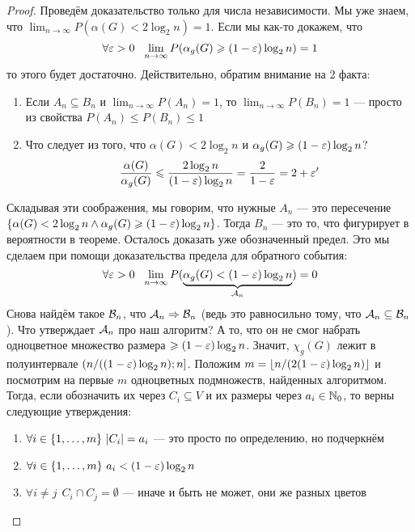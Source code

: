 \begin{proof}
	Проведём доказательство только для числа независимости. Мы уже знаем, что $\lim_{n \to \infty} P(\alpha(G) < 2\log_2 n) = 1$. Если мы как-то докажем, что
	\[
		\forall \varepsilon > 0\ \ \lim_{n \to \infty} P(\alpha_g(G) \geqslant (1 - \varepsilon)\log_2 n) = 1
	\]
	то этого будет достаточно. Действительно, обратим внимание на 2 факта:
	\begin{enumerate}
		\item Если $A_n \subseteq B_n$ и $\lim_{n \to \infty} P(A_n) = 1$, то $\lim_{n \to \infty} P(B_n) = 1$ --- просто из свойства $P(A_n) \le P(B_n) \le 1$
		
		\item Что следует из того, что $\alpha(G) < 2\log_2 n$ и $\alpha_g(G) \geqslant (1 - \varepsilon)\log_2 n$?
		\[
			\frac{\alpha(G)}{\alpha_g(G)} \leqslant \frac{2\log_2 n}{(1 - \varepsilon)\log_2 n} = \frac{2}{1 - \varepsilon} = 2 + \varepsilon'
		\]
	\end{enumerate}
	Складывая эти соображения, мы говорим, что нужные $A_n$ --- это пересечение  $\{\alpha(G) < 2\log_2 n \wedge \alpha_g(G) \geqslant (1 - \varepsilon)\log_2 n\}$. Тогда $B_n$ --- это  то, что фигурирует в вероятности в теореме. Осталось доказать уже обозначенный предел. Это мы сделаем при помощи доказательства предела для обратного события:
	\[
		\forall \eps > 0\ \ \lim_{n \to \infty} P(\underbrace{\alpha_g(G) < (1 - \eps)\log_2 n}_{\cA_n}) = 0
	\]
	Снова найдём такое $\mathcal{B}_n$, что $\mathcal{A}_n \Rightarrow \mathcal{B}_n$ (ведь это равносильно тому, что $\mathcal{A}_n \subseteq \mathcal{B}_n$). Что утверждает $\mathcal{A}_n$ про наш алгоритм? А то, что он не смог набрать одноцветное множество размера $\geqslant (1 - \varepsilon)\log_2 n$. Значит, $\chi_g(G)$ лежит в полуинтервале $(n / ((1 - \varepsilon)\log_2 n); n]$. Положим $m = \left\lfloor n / (2(1 - \varepsilon)\log_2 n) \right\rfloor$ и посмотрим на первые $m$ одноцветных подмножеств, найденных алгоритмом. Тогда, если обозначить их через $C_i \subseteq V$ и их размеры через $a_i \in \mathbb{N}_0$, то верны следующие утверждения:
	\begin{enumerate}
		\item $\forall i \in \{1, \ldots, m\}\ |C_i| = a_i$ --- это просто по определению, но подчеркнём
		
		\item $\forall i \in \{1, \ldots, m\}\ a_i < (1 - \varepsilon)\log_2 n$
		
		\item $\forall i \neq j\ \ C_i \cap C_j = \emptyset$ --- иначе и быть не может, они же разных цветов
		

\end{enumerate}
\end{proof}
